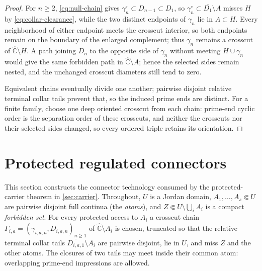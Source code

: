 \documentclass[11pt,reqno]{amsart}
\numberwithin{equation}{section}
\theoremstyle{plain}
\theoremstyle{definition}
\theoremstyle{remark}
\newcommand{\Chat}{\widehat{\mathbb C}}
\begin{document}
\begin{proof}
For $n\ge2$, \eqref{eq:null-chain} gives
$\gamma_n^\circ\subset D_{n-1}\subset D_1$, so
$\gamma_n^\circ\subset\overline{D_1}\setminus A$ misses $H$ by
\eqref{eq:collar-clearance}, while the two distinct endpoints of
$\gamma_n$ lie in $A\subset H$.  Every neighborhood of either endpoint
meets the crosscut interior, so both endpoints remain on the boundary
of the enlarged complement; thus $\gamma_n$ remains a crosscut of
$\Chat\setminus H$.  A path joining $D_n$ to the opposite side of
$\gamma_n$ without meeting $H\cup\gamma_n$ would give the same
forbidden path in $\Chat\setminus A$; hence the selected sides remain
nested, and the unchanged crosscut diameters still tend to zero.

Equivalent chains eventually divide one another; pairwise disjoint
relative terminal collar tails prevent that, so the induced prime ends
are distinct.  For a finite family, choose one deep oriented crosscut
from each chain: prime-end cyclic order is the separation order of
these crosscuts, and neither the crosscuts nor their selected sides
changed, so every ordered triple retains its orientation.
\end{proof}

\section{Protected regulated connectors}
\label{sec:connector}

This section constructs the connector technology consumed by the
protected-carrier theorem in \cref{sec:carrier}.  Throughout, $U$ is a
Jordan domain, $A_1,\ldots,A_s\Subset U$ are pairwise disjoint full
continua (the \emph{atoms}), and $Z\Subset U\setminus\bigcup_iA_i$ is a
compact \emph{forbidden set}.  For every protected access to $A_i$ a
crosscut chain
$\Gamma_{i,a}=(\gamma_{i,a,n},D_{i,a,n})_{n\ge1}$ of
$\Chat\setminus A_i$ is chosen, truncated so that the relative terminal
collar tails $\overline{D_{i,a,1}}\setminus A_i$ are pairwise disjoint,
lie in $U$, and miss $Z$ and the other atoms.  The closures of two
tails may meet inside their common atom: overlapping prime-end
impressions are allowed.
\end{document}
